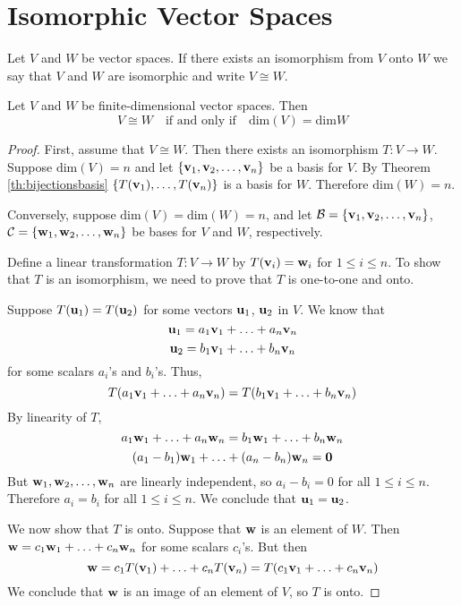 \documentclass{ximera}
\renewcommand{\vec}[1]{{\bf #1}}
\begin{document}
 
\section{Isomorphic Vector Spaces}
\begin{definition} Let $V$ and $W$ be vector spaces.  If there exists an isomorphism from $V$ onto $W$ we say that $V$ and $W$ are isomorphic and write $V\cong W$.
\end{definition}

\begin{theorem}\label{th:ndimspacesisorn}
Let $V$ and $W$ be finite-dimensional vector spaces. Then
$$V\cong W\quad\text{if and only if}\quad \text{dim}(V)=\text{dim}W$$
\end{theorem}
\begin{proof}
First, assume that $V\cong W$.  Then there exists an isomorphism $T:V\rightarrow W$.  Suppose $\text{dim}(V)=n$ and let $\{\vec{v}_1,\vec{v}_2,\ldots ,\vec{v}_n\}$ be a basis for $V$. By Theorem \ref{th:bijectionsbasis} $\{T(\vec{v}_1),\ldots ,T(\vec{v}_n)\}$ is a basis for $W$. Therefore $\text{dim}(W)=n$.

Conversely, suppose $\text{dim}(V)=\text{dim}(W)=n$, and let $\mathcal{B}=\{\vec{v}_1,\vec{v}_2,\ldots ,\vec{v}_n\}$, $\mathcal{C}=\{\vec{w}_1,\vec{w}_2,\ldots ,\vec{w}_n\}$ be bases for $V$ and $W$, respectively.

Define a linear transformation $T:V\rightarrow W$ by $T(\vec{v}_i)=\vec{w}_i$ for $1\leq i\leq n$.  To show that $T$ is an isomorphism, we need to prove that $T$ is one-to-one and onto.

Suppose $T(\vec{u}_1)=T(\vec{u}_2)$ for some vectors $\vec{u}_1$, $\vec{u}_2$ in $V$.  We know that
$$\vec{u}_1=a_1\vec{v}_1+\ldots +a_n\vec{v}_n$$
$$\vec{u}_2=b_1\vec{v}_1+\ldots +b_n\vec{v}_n$$
for some scalars $a_i$'s and $b_i$'s.  Thus,
$$T(a_1\vec{v}_1+\ldots +a_n\vec{v}_n)=T(b_1\vec{v}_1+\ldots +b_n\vec{v}_n)$$
By linearity of $T$,
$$a_1\vec{w}_1+\ldots +a_n\vec{w}_n=b_1\vec{w}_1+\ldots +b_n\vec{w}_n$$
$$(a_1-b_1)\vec{w}_1+\ldots +(a_n-b_n)\vec{w}_n=\vec{0}$$
But $\vec{w}_1,\vec{w}_2,\ldots ,\vec{w}_n$ are linearly independent, so $a_i-b_i=0$ for all $1\leq i\leq n$.  Therefore $a_i=b_i$ for all $1\leq i\leq n$.  We conclude that $\vec{u}_1=\vec{u}_2$.

We now show that $T$ is onto. Suppose that $\vec{w}$ is an element of $W$.  Then $\vec{w}=c_1\vec{w}_1+\ldots +c_n\vec{w}_n$ for some scalars $c_i$'s.  But then
$$\vec{w}=c_1T(\vec{v}_1)+\ldots +c_nT(\vec{v}_n)=T(c_1\vec{v}_1+\ldots +c_n\vec{v}_n)$$
We conclude that $\vec{w}$ is an image of an element of $V$, so $T$ is onto.

\end{proof}
\end{document}
